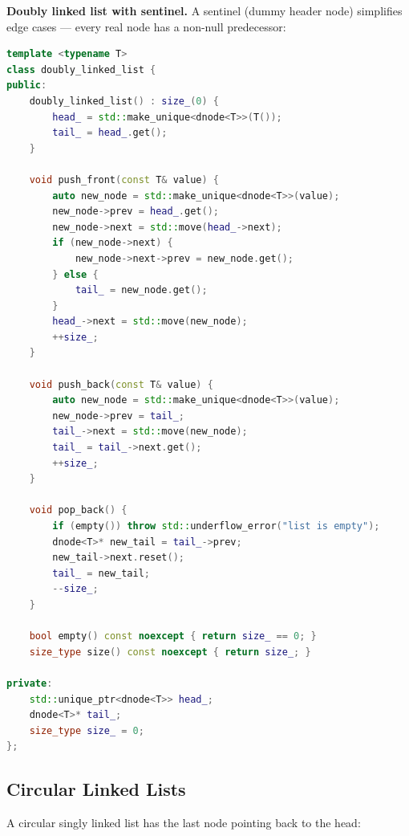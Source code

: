 \textbf{Doubly linked list with sentinel.} A sentinel (dummy header node) simplifies edge cases — every real node has a non-null predecessor:

\begin{lstlisting}[language=C++]
template <typename T>
class doubly_linked_list {
public:
    doubly_linked_list() : size_(0) {
        head_ = std::make_unique<dnode<T>>(T());
        tail_ = head_.get();
    }

    void push_front(const T& value) {
        auto new_node = std::make_unique<dnode<T>>(value);
        new_node->prev = head_.get();
        new_node->next = std::move(head_->next);
        if (new_node->next) {
            new_node->next->prev = new_node.get();
        } else {
            tail_ = new_node.get();
        }
        head_->next = std::move(new_node);
        ++size_;
    }

    void push_back(const T& value) {
        auto new_node = std::make_unique<dnode<T>>(value);
        new_node->prev = tail_;
        tail_->next = std::move(new_node);
        tail_ = tail_->next.get();
        ++size_;
    }

    void pop_back() {
        if (empty()) throw std::underflow_error("list is empty");
        dnode<T>* new_tail = tail_->prev;
        new_tail->next.reset();
        tail_ = new_tail;
        --size_;
    }

    bool empty() const noexcept { return size_ == 0; }
    size_type size() const noexcept { return size_; }

private:
    std::unique_ptr<dnode<T>> head_;
    dnode<T>* tail_;
    size_type size_ = 0;
};
\end{lstlisting}

\subsection{Circular Linked Lists}

A circular singly linked list has the last node pointing back to the head:

\begin{figure}[ht]
\centering
{}
\end{figure}


